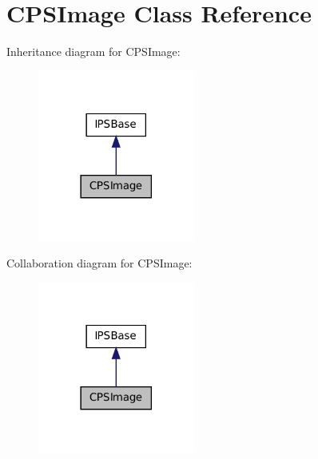 \hypertarget{classCPSImage}{
\section{CPSImage Class Reference}
\label{classCPSImage}
}


Inheritance diagram for CPSImage:\nopagebreak
\begin{figure}[H]
\begin{center}
\leavevmode
\includegraphics[width=146pt]{classCPSImage__inherit__graph}
\end{center}
\end{figure}


Collaboration diagram for CPSImage:\nopagebreak
\begin{figure}[H]
\begin{center}
\leavevmode
\includegraphics[width=146pt]{classCPSImage__coll__graph}
\end{center}
\end{figure}
